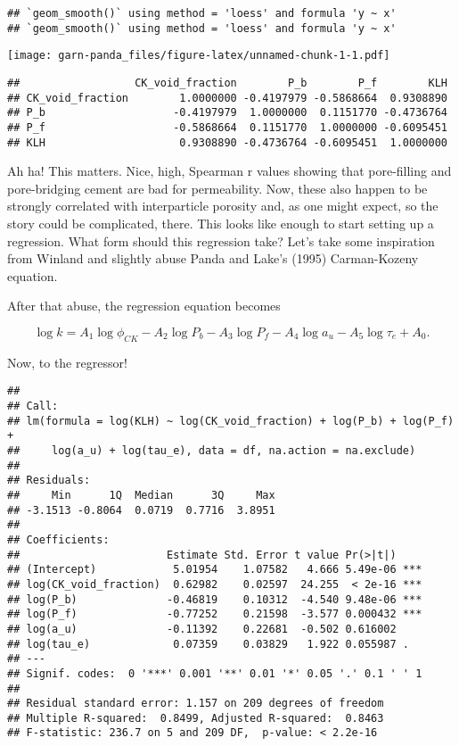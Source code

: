 \documentclass[]{article}
\begin{document}
\begin{verbatim}
## `geom_smooth()` using method = 'loess' and formula 'y ~ x'
## `geom_smooth()` using method = 'loess' and formula 'y ~ x'
\end{verbatim}

\texttt{[image: garn-panda\_files/figure-latex/unnamed-chunk-1-1.pdf]}

\begin{verbatim}
##                  CK_void_fraction        P_b        P_f        KLH
## CK_void_fraction        1.0000000 -0.4197979 -0.5868664  0.9308890
## P_b                    -0.4197979  1.0000000  0.1151770 -0.4736764
## P_f                    -0.5868664  0.1151770  1.0000000 -0.6095451
## KLH                     0.9308890 -0.4736764 -0.6095451  1.0000000
\end{verbatim}

Ah ha! This matters. Nice, high, Spearman r values showing that
pore-filling and pore-bridging cement are bad for permeability. Now,
these also happen to be strongly correlated with interparticle porosity
and, as one might expect, so the story could be complicated, there. This
looks like enough to start setting up a regression. What form should
this regression take? Let's take some inspiration from Winland and
slightly abuse Panda and Lake's (1995) Carman-Kozeny equation.

After that abuse, the regression equation becomes

\begin{equation}
\log k = A_1 \log \phi_{CK} - A_2 \log P_b - A_3 \log P_f - A_4 \log a_u - A_5 \log \tau_e + A_0.
\end{equation}

Now, to the regressor!

\begin{verbatim}
## 
## Call:
## lm(formula = log(KLH) ~ log(CK_void_fraction) + log(P_b) + log(P_f) + 
##     log(a_u) + log(tau_e), data = df, na.action = na.exclude)
## 
## Residuals:
##     Min      1Q  Median      3Q     Max 
## -3.1513 -0.8064  0.0719  0.7716  3.8951 
## 
## Coefficients:
##                       Estimate Std. Error t value Pr(>|t|)    
## (Intercept)            5.01954    1.07582   4.666 5.49e-06 ***
## log(CK_void_fraction)  0.62982    0.02597  24.255  < 2e-16 ***
## log(P_b)              -0.46819    0.10312  -4.540 9.48e-06 ***
## log(P_f)              -0.77252    0.21598  -3.577 0.000432 ***
## log(a_u)              -0.11392    0.22681  -0.502 0.616002    
## log(tau_e)             0.07359    0.03829   1.922 0.055987 .  
## ---
## Signif. codes:  0 '***' 0.001 '**' 0.01 '*' 0.05 '.' 0.1 ' ' 1
## 
## Residual standard error: 1.157 on 209 degrees of freedom
## Multiple R-squared:  0.8499, Adjusted R-squared:  0.8463 
## F-statistic: 236.7 on 5 and 209 DF,  p-value: < 2.2e-16
\end{verbatim}
\end{document}

